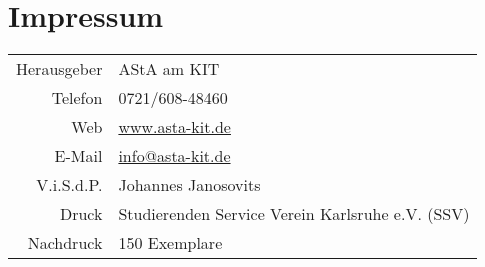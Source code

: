 \vspace*{\fill}
\section*{Impressum}
\begin{tabular}{rl}
	Herausgeber & AStA am KIT \\
	Telefon & 0721/608-48460 \\
	Web & \url{www.asta-kit.de} \\
	E-Mail & \href{mailto:info@asta-kit.de}{info@asta-kit.de}\\
	V.i.S.d.P. & Johannes Janosovits\\
	Druck & Studierenden Service Verein Karlsruhe e.V. (SSV)\\
	Nachdruck & 150 Exemplare
\end{tabular}

